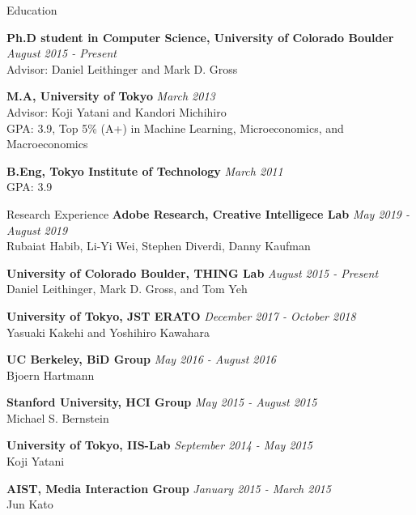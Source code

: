 \documentclass{resume} %
\begin{document}
\begin{rSection}{Education}

{\bf Ph.D student in Computer Science, University of Colorado Boulder} \hfill {\em August 2015 - Present} \\
Advisor: Daniel Leithinger and Mark D. Gross

{\bf M.A, University of Tokyo} \hfill {\em March 2013} \\
Advisor: Koji Yatani and Kandori Michihiro \\
GPA: 3.9, Top 5\% (A+) in Machine Learning, Microeconomics, and Macroeconomics

{\bf B.Eng, Tokyo Institute of Technology} \hfill {\em March 2011} \\ 
GPA: 3.9

\end{rSection}



\begin{rSection}{Research Experience}
{\bf Adobe Research, Creative Intelligece Lab} \hfill {\em May 2019 - August 2019} \\
Rubaiat Habib, Li-Yi Wei, Stephen Diverdi, Danny Kaufman

{\bf University of Colorado Boulder, THING Lab} \hfill {\em August 2015 - Present} \\
Daniel Leithinger, Mark D. Gross, and Tom Yeh

{\bf University of Tokyo, JST ERATO} \hfill {\em December 2017 - October 2018} \\
Yasuaki Kakehi and Yoshihiro Kawahara

{\bf UC Berkeley, BiD Group} \hfill {\em May 2016 - August 2016} \\
Bjoern Hartmann

{\bf Stanford University, HCI Group} \hfill {\em May 2015 - August 2015} \\
Michael S. Bernstein

{\bf University of Tokyo, IIS-Lab} \hfill {\em September 2014 - May 2015} \\
Koji Yatani

{\bf AIST, Media Interaction Group} \hfill {\em January 2015 - March 2015} \\
Jun Kato

\end{rSection}
\end{document}
